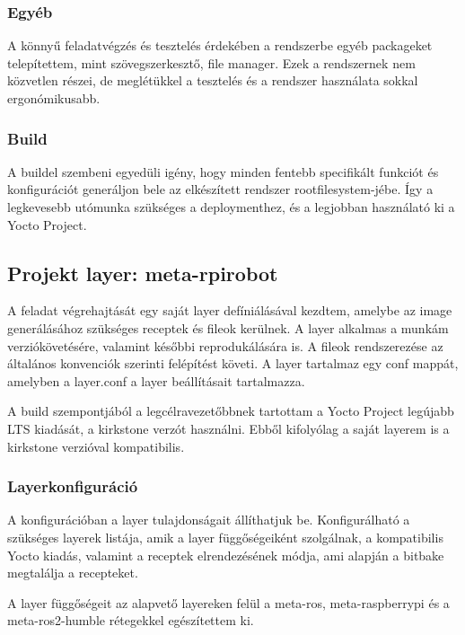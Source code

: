 \subsubsection{Egyéb}

A könnyű feladatvégzés és tesztelés érdekében a rendszerbe egyéb packageket
telepítettem, mint szövegszerkesztő, file manager. Ezek a rendszernek nem
közvetlen részei, de meglétükkel a tesztelés és a rendszer használata sokkal
ergonómikusabb. 

\subsubsection{Build}

A buildel szembeni egyedüli igény, hogy minden fentebb specifikált funkciót és
konfigurációt generáljon bele az elkészített rendszer rootfilesystem-jébe. Így a
legkevesebb utómunka szükséges a deploymenthez, és a legjobban használató ki a
Yocto Project.

\subsection{Projekt layer: meta-rpirobot}

A feladat végrehajtását egy saját layer defíniálásával kezdtem, amelybe az image
generálásához szükséges receptek és fileok kerülnek. A layer alkalmas a munkám
verziókövetésére, valamint későbbi reprodukálására is. A fileok rendszerezése az
általános konvenciók szerinti felépítést követi. A layer tartalmaz egy conf
mappát, amelyben a layer.conf a layer beállításait tartalmazza.

A build szempontjából a legcélravezetőbbnek tartottam a Yocto Project legújabb
LTS kiadását, a kirkstone verzót használni. Ebből kifolyólag a saját layerem is a
kirkstone verzióval kompatibilis.

\subsubsection{Layerkonfiguráció}

A konfigurációban a layer tulajdonságait állíthatjuk be. Konfigurálható a
szükséges layerek listája, amik a layer függőségeiként szolgálnak, a kompatibilis
Yocto kiadás, valamint a receptek elrendezésének módja, ami alapján a bitbake
megtalálja a recepteket.

A layer függőségeit az alapvető layereken felül a meta-ros, meta-raspberrypi
és a meta-ros2-humble rétegekkel egészítettem ki.

